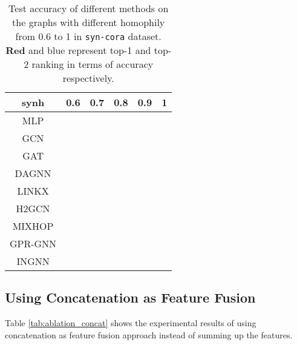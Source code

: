 \documentclass{article}
\theoremstyle{plain}
\newcommand{\pjn}{{INGNN}}
\begin{document}
\begin{table}[ht]
\centering
\caption{Test accuracy of different methods on the graphs with different homophily from 0.6 to 1 in \texttt{syn-cora} dataset. {\color{red} \textbf{Red}} and {\color{blue} blue} represent top-1 and top-2 ranking in terms of accuracy respectively.}
\label{tab:syn-cora-results2}
\vskip 0.1in
\small
\tabcolsep=0.1cm
\begin{tabular}{c|ccccc}
\toprule
synh    & 0.6                                                                                     & 0.7                                                                                     & 0.8                                                                                     & 0.9                                                                                     & 1                                                                                       \\
\midrule
\midrule
MLP	& 	 & 	 & 	 & 	 & 	 \\
GCN	& 	 & 	 & 	 & 	 & 	 \\
GAT	& 	 & 	 & 	 & 	 & {\color[HTML]{FF0000} } \\
DAGNN  & 	 & 	 & 	 & {\color[HTML]{FF0000} } & {\color[HTML]{0000FF} }	  \\
LINKX  & 	 & 	 & 	 & 	 & 	 \\
H2GCN  & {\color[HTML]{0000FF} }	  & {\color[HTML]{FF0000} } & 	 & 	 & 	 \\
MIXHOP & 	 & 	 & 	 & 	 & {\color[HTML]{FF0000} } \\
GPR-GNN & 	 & 	 & {\color[HTML]{0000FF} }	  & {\color[HTML]{0000FF} }	  & {\color[HTML]{FF0000} } \\
\pjn{}   & {\color[HTML]{FF0000} } & {\color[HTML]{0000FF} }	  & {\color[HTML]{FF0000} } & 	 & {\color[HTML]{0000FF} }	 \\
\bottomrule
\end{tabular}
\end{table}


\subsection{Using Concatenation as Feature Fusion} \label{sec:app_ablation_concat}

Table \ref{tab:ablation_concat} shows the experimental results of using concatenation as feature fusion approach instead of summing up the features.
\end{document}
